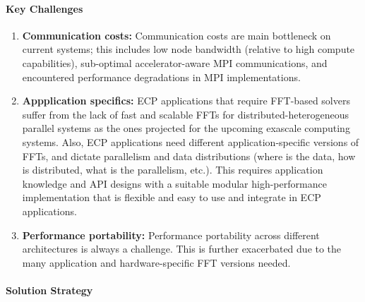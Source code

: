 \paragraph{Key  Challenges}
\begin{enumerate}
\item
\textbf{Communication costs:}
Communication costs are main bottleneck 
on current systems; this includes low node bandwidth (relative to 
high compute capabilities), sub-optimal accelerator-aware MPI communications,
and encountered performance degradations in MPI implementations.

\item
\textbf{Appplication specifics:}
ECP applications that require FFT-based solvers suffer from the lack of fast 
and scalable FFTs for distributed-heterogeneous parallel systems 
as the ones projected for the upcoming exascale computing systems. Also, ECP 
applications need different application-specific versions of FFTs,
and dictate parallelism and data distributions (where is the data, how is 
distributed, what is the parallelism, etc.). This requires application
knowledge and API designs with a suitable modular high-performance 
implementation that is flexible and easy to use and integrate in ECP applications.

\item
\textbf{Performance portability:}
Performance portability across different architectures is always a challenge.
This is further exacerbated due to the many application and 
hardware-specific FFT versions needed.
\end{enumerate}

\paragraph{Solution Strategy}

